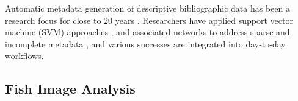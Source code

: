 \documentclass[conference]{IEEEtran}
\begin{document}
Automatic metadata generation of descriptive bibliographic data has been a research focus for close to 20 years \cite{liddy2002automatic,greenberg2004metadata,cardinaels2005automating}. Researchers have applied support vector machine (SVM) approaches \cite{han2003automatic}, and associated networks to address sparse and incomplete metadata \cite{rodriguez2009automatic}, and various successes are integrated into day-to-day workflows. 


\subsection{Fish Image Analysis}
\end{document}
